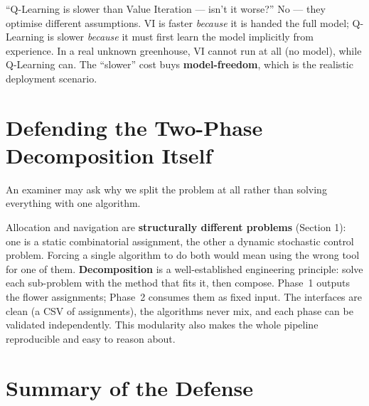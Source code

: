 \documentclass[11pt]{article}
\begin{document}
\begin{qbox}{``Q-Learning is slower than Value Iteration --- isn't it worse?''}
No --- they optimise different assumptions. VI is faster \emph{because} it is
handed the full model; Q-Learning is slower \emph{because} it must first learn
the model implicitly from experience. In a real unknown greenhouse, VI cannot run
at all (no model), while Q-Learning can. The ``slower'' cost buys
\textbf{model-freedom}, which is the realistic deployment scenario.
\end{qbox}

\section{Defending the Two-Phase Decomposition Itself}
\label{sec:decomp}

An examiner may ask why we split the problem at all rather than solving
everything with one algorithm.

\begin{rebut}
Allocation and navigation are \textbf{structurally different problems}
(Section 1): one is a static combinatorial assignment, the other a dynamic
stochastic control problem. Forcing a single algorithm to do both would mean
using the wrong tool for one of them. \textbf{Decomposition} is a well-established
engineering principle: solve each sub-problem with the method that fits it, then
compose. Phase~1 outputs the flower assignments; Phase~2 consumes them as fixed
input. The interfaces are clean (a CSV of assignments), the algorithms never mix,
and each phase can be validated independently. This modularity also makes the
whole pipeline reproducible and easy to reason about.
\end{rebut}

\section{Summary of the Defense}
\end{document}
